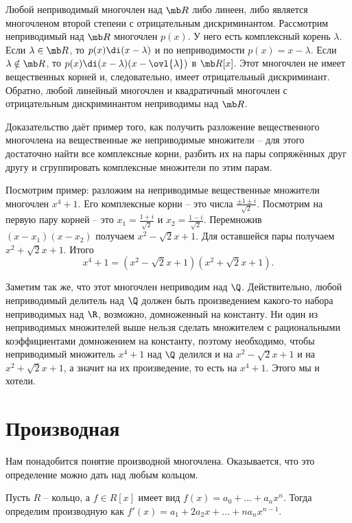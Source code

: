 \thrm Любой неприводимый многочлен над $\mb R$ либо линеен, либо является многочленом второй степени с отрицательным дискриминантом.
\ethrm
\proof Рассмотрим неприводимый над $\mb R$ многочлен $p(x)$. У него есть комплексный корень $\lambda$. Если $\lambda \in \mb R$, то $p(x)\di (x-\lambda)$ и по неприводимости $p(x)=x-\lambda$.  Если $\lambda \notin \mb R$, то $p(x)\di (x-\lambda)(x-\ovl{\lambda})$ в $\mb R[x]$. Этот многочлен не имеет вещественных корней и, следовательно, имеет отрицательный дискриминант. Обратно, любой линейный многочлен и квадратичный многочлен с отрицательным дискриминантом неприводимы над $\mb R$.
\endproof

Доказательство даёт пример того, как получить разложение вещественного многочлена на вещественные же неприводимые множители -- для этого достаточно найти все комплексные корни, разбить их на пары сопряжённых друг другу и сгруппировать комплексные множители по этим парам.

Посмотрим пример: разложим на неприводимые вещественные множители многочлен $x^4+1$. Его комплексные корни -- это числа $\frac{\pm 1\pm i}{\sqrt{2}}$. Посмотрим на первую пару корней  -- это $x_1=\frac{1+i}{\sqrt{2}}$ и $x_2=\frac{1-i}{\sqrt{2}}$. Перемножив $(x-x_1)(x-x_2)$ получаем $x^2-\sqrt{2}x+1$. Для оставшейся пары получаем $x^2+\sqrt{2}x+1$. Итого
$$x^4+1=(x^2-\sqrt{2}x+1)(x^2+\sqrt{2}x+1).$$

Заметим так же, что этот многочлен неприводим над $\Q$. Действительно, любой неприводимый делитель над $\Q$ должен быть произведением какого-то набора неприводимых над $\R$, возможно, домноженный на константу. Ни один из неприводимых множителей выше нельзя сделать множителем с рациональными коэффициентами домножением на константу, поэтому необходимо, чтобы неприводимый множитель $x^4+1$ над $\Q$ делился и на $x^2-\sqrt{2}x+1$ и на $x^2+\sqrt{2}x+1$, а значит на их произведение, то есть на $x^4+1$. Этого мы и хотели.




\section{Производная}

Нам понадобится понятие производной многочлена. Оказывается, что это определение можно дать над любым кольцом. 

\dfn Пусть $R$ -- кольцо, а $f\in R[x] $ имеет вид $f(x)=a_0+\dots+a_nx^n$. Тогда определим производную как $f'(x)=a_1+2a_2x+\dots+na_nx^{n-1}$.
\edfn

